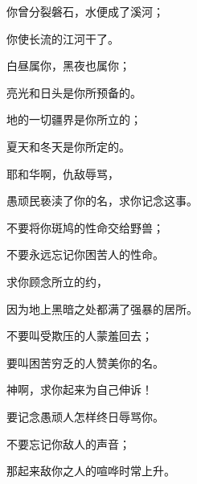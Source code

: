 {\par }{\Q {}你曾分裂磐石，水便成了溪河；
\par }{\Q 你使长流的江河干了。
\par }{\Q {}白昼属你，黑夜也属你；
\par }{\Q 亮光和日头是你所预备的。
\par }{\Q {}地的一切疆界是你所立的；
\par }{\Q 夏天和冬天是你所定的。
\par }{\BB \par }{\Q {}耶和华啊，仇敌辱骂，
\par }{\Q 愚顽民亵渎了你的名，求你记念这事。
\par }{\Q {}不要将你斑鸠的性命交给野兽；
\par }{\Q 不要永远忘记你困苦人的性命。
\par }{\BB \par }{\Q {}求你顾念所立的约，
\par }{\Q 因为地上黑暗之处都满了强暴的居所。
\par }{\Q {}不要叫受欺压的人蒙羞回去；
\par }{\Q 要叫困苦穷乏的人赞美你的名。
\par }{\BB \par }{\Q {}神啊，求你起来为自己伸诉！
\par }{\Q 要记念愚顽人怎样终日辱骂你。
\par }{\Q {}不要忘记你敌人的声音；
\par }{\Q 那起来敌你之人的喧哗时常上升。

\par }
